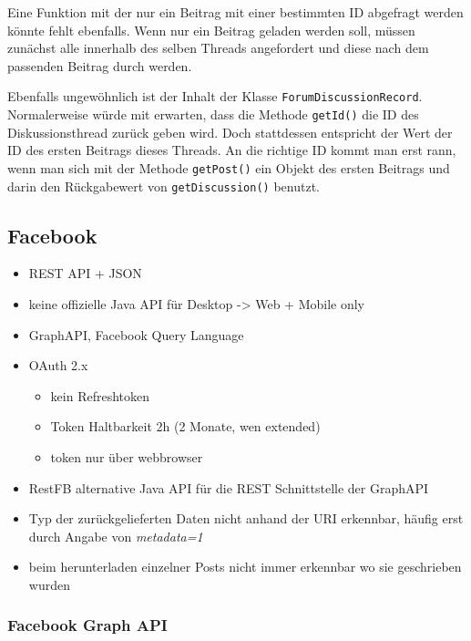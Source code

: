 Eine Funktion mit der nur ein Beitrag mit einer bestimmten ID abgefragt werden könnte fehlt ebenfalls. Wenn nur ein Beitrag geladen werden soll, müssen zunächst alle innerhalb des selben Threads angefordert und diese nach dem passenden Beitrag durch werden. 

Ebenfalls ungewöhnlich ist der Inhalt der Klasse \texttt{ForumDiscussionRecord}. Normalerweise würde mit erwarten, dass die Methode \texttt{getId()} die ID des Diskussionsthread zurück geben wird. Doch stattdessen entspricht der Wert der ID des ersten Beitrags dieses Threads. An die richtige ID kommt man erst rann, wenn man sich mit der Methode \texttt{getPost()} ein Objekt des ersten Beitrags und darin den Rückgabewert von \texttt{getDiscussion()} benutzt.



\subsection{Facebook} %
\label{sub:facebook_connector}

\begin{itemize}
    \item REST API + JSON
    \item keine offizielle Java API für Desktop -> Web + Mobile only
    \item GraphAPI, Facebook Query Language
    \item OAuth 2.x
    \begin{itemize}
        \item kein Refreshtoken
        \item Token Haltbarkeit 2h (2 Monate, wen extended)
        \item token nur über webbrowser
    \end{itemize}
    \item RestFB alternative Java API für die REST Schnittstelle der GraphAPI
    \item Typ der zurückgelieferten Daten nicht anhand der URI erkennbar, häufig erst durch Angabe von \emph{metadata=1}
    \item beim herunterladen einzelner Posts nicht immer erkennbar wo sie geschrieben wurden
\end{itemize}

\subsubsection{Facebook Graph API} %
\label{ssub:facebook_graph_api}

